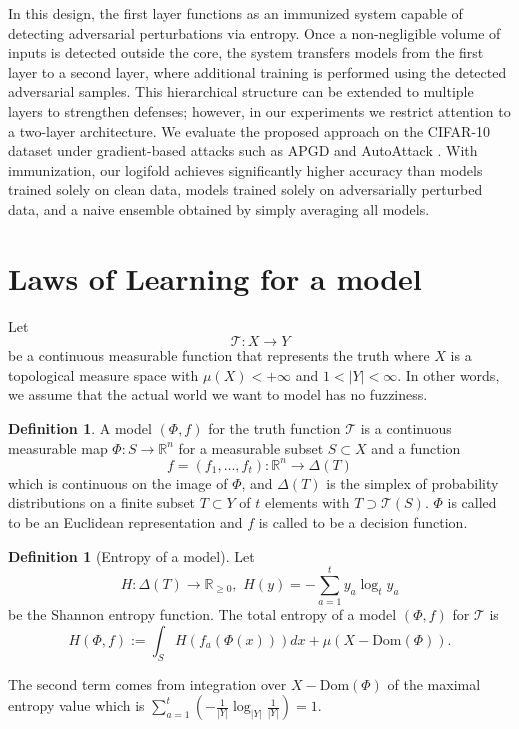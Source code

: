 \documentclass{article}
\theoremstyle{plain}
\theoremstyle{definition}
\newtheorem{definition}[theorem]{Definition}
\theoremstyle{remark}
\newcommand{\R}{\mathbb{R}}
\newcommand{\cT}{\mathcal{T}}
\newcommand{\Dom}{\mathrm{Dom}}
\begin{document}
In this design, the first layer functions as an immunized system capable of detecting adversarial perturbations via entropy. Once a non-negligible volume of inputs is detected outside the core, the system transfers models from the first layer to a second layer, where additional training is performed using the detected adversarial samples. This hierarchical structure can be extended to multiple layers to strengthen defenses; however, in our experiments we restrict attention to a two-layer architecture.
We evaluate the proposed approach on the CIFAR-10 \cite{CIFAR-10} dataset under gradient-based attacks such as APGD and AutoAttack \cite{auto_attack, APGD}. With immunization, our logifold achieves significantly higher accuracy than models trained solely on clean data, models trained solely on adversarially perturbed data, and a naive ensemble obtained by simply averaging all models.

\section{Laws of Learning for a model}
Let 
$$\cT:X \to Y$$ 
be a continuous measurable function that represents the truth where $X$ is a topological measure space with $\mu(X) < +\infty$ and $1<|Y|<\infty$. In other words, we assume that the actual world we want to model has no fuzziness.

\begin{definition} \label{def:model}
	A model $(\Phi,f)$ for the truth function $\cT$ is a continuous measurable map $\Phi: S \to \R^n$ for a measurable subset $S \subset X$ and a function 
	$$f=(f_1,\ldots,f_t): \R^n \to \Delta(T)$$ 
	which is continuous on the image of $\Phi$, and $\Delta(T)$ is the simplex of probability distributions on a finite subset $T \subset Y$ of $t$ elements with $T \supset \cT(S)$. $\Phi$ is called to be an Euclidean representation and $f$ is called to be a decision function.
\end{definition}

\begin{definition}[Entropy of a model] \label{def:entropy}
	Let
	\begin{equation}
		H:\Delta(T) \to \R_{\geq 0}, \,\,H(y) = -\sum_{a=1}^t y_a \log_t y_a \label{eq:H(y)}
	\end{equation} 
	be the Shannon entropy function.
	The total entropy of a model $(\Phi,f)$ for $\cT$ is 
	$$ H(\Phi,f) := \int_S H(f_a(\Phi(x))) dx + \mu(X-\Dom(\Phi)). $$
\end{definition}
The second term comes from integration over $X - \Dom(\Phi)$ of the maximal entropy value which is $\sum_{a=1}^t (-\frac{1}{|Y|} \log_{|Y|} \frac{1}{|Y|}) = 1$. 
\end{document}
